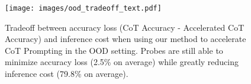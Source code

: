 \begin{figure}
    \centering
    \texttt{[image: images/ood\_tradeoff\_text.pdf]}
    \caption{Tradeoff between accuracy loss (CoT Accuracy - Accelerated CoT Accuracy) and inference cost when using our method to accelerate CoT Prompting in the OOD setting. Probes are still able to minimize accuracy loss (2.5\% on average) while greatly reducing inference cost (79.8\% on average).}
    \label{fig:ood}
\end{figure}